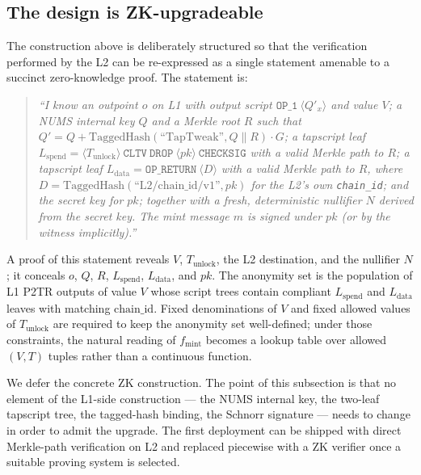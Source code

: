 \documentclass[11pt,a4paper]{article}
\newcommand{\fmint}{f_{\mathrm{mint}}}
\begin{document}
\subsection{The design is ZK-upgradeable}
\label{sec:zkupgrade}

The construction above is deliberately structured so that the verification performed by the L2 can be re-expressed as a single statement amenable to a succinct zero-knowledge proof. The statement is:

\begin{quote}\itshape
``I know an outpoint $o$ on L1 with output script $\texttt{OP\_1}\ \langle Q'_x\rangle$ and value $V$; a NUMS internal key $Q$ and a Merkle root $R$ such that $Q' = Q + \mathrm{TaggedHash}(\text{``TapTweak''}, Q\|R)\cdot G$; a tapscript leaf $L_{\mathrm{spend}} = \langle T_{\mathrm{unlock}}\rangle\ \texttt{CLTV}\ \texttt{DROP}\ \langle pk\rangle\ \texttt{CHECKSIG}$ with a valid Merkle path to $R$; a tapscript leaf $L_{\mathrm{data}} = \texttt{OP\_RETURN}\ \langle D\rangle$ with a valid Merkle path to $R$, where $D = \mathrm{TaggedHash}(\text{``L2/chain\_id/v1''}, pk)$ for the L2's own \texttt{chain\_id}; and the secret key for $pk$; together with a fresh, deterministic nullifier $N$ derived from the secret key. The mint message $m$ is signed under $pk$ (or by the witness implicitly).''
\end{quote}

A proof of this statement reveals $V$, $T_{\mathrm{unlock}}$, the L2 destination, and the nullifier $N$; it conceals $o$, $Q$, $R$, $L_{\mathrm{spend}}$, $L_{\mathrm{data}}$, and $pk$. The anonymity set is the population of L1 P2TR outputs of value $V$ whose script trees contain compliant $L_{\mathrm{spend}}$ and $L_{\mathrm{data}}$ leaves with matching $\mathrm{chain\_id}$. Fixed denominations of $V$ and fixed allowed values of $T_{\mathrm{unlock}}$ are required to keep the anonymity set well-defined; under those constraints, the natural reading of $\fmint$ becomes a lookup table over allowed $(V, T)$ tuples rather than a continuous function.

We defer the concrete ZK construction. The point of this subsection is that no element of the L1-side construction --- the NUMS internal key, the two-leaf tapscript tree, the tagged-hash binding, the Schnorr signature --- needs to change in order to admit the upgrade. The first deployment can be shipped with direct Merkle-path verification on L2 and replaced piecewise with a ZK verifier once a suitable proving system is selected.
\end{document}

